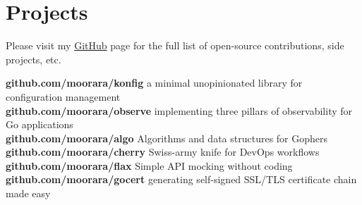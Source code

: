 \documentclass[]{cv-style}                     %
\begin{document}

\section{Projects}

Please visit my \href{http://github.com/moorara}{GitHub} page for the full list of open-source contributions, side projects, etc.

\textbf{github.com/moorara/konfig} a minimal unopinionated library for configuration management  \\
\textbf{github.com/moorara/observe} implementing three pillars of observability for Go applications \\
\textbf{github.com/moorara/algo} Algorithms and data structures for Gophers \\
\textbf{github.com/moorara/cherry} Swiss-army knife for DevOps workflows  \\
\textbf{github.com/moorara/flax} Simple API mocking without coding  \\
\textbf{github.com/moorara/gocert} generating self-signed SSL/TLS certificate chain made easy \\

\begin{entrylist}



\end{entrylist}


\end{document}
